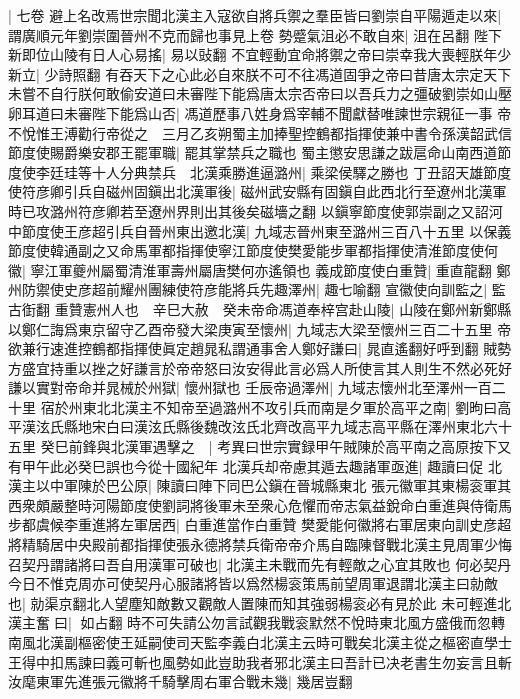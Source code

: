 |{
	七卷}
避上名改焉世宗聞北漢主入寇欲自將兵禦之羣臣皆曰劉崇自平陽遁走以來|{
	謂廣順元年劉崇圍晉州不克而歸也事見上卷}
勢蹙氣沮必不敢自來|{
	沮在呂翻}
陛下新即位山陵有日人心易搖|{
	易以䜴翻}
不宜輕動宜命將禦之帝曰崇幸我大喪輕朕年少新立|{
	少詩照翻}
有吞天下之心此必自來朕不可不往馮道固爭之帝曰昔唐太宗定天下未嘗不自行朕何敢偷安道曰未審陛下能爲唐太宗否帝曰以吾兵力之彊破劉崇如山壓卵耳道曰未審陛下能爲山否|{
	馮道歷事八姓身爲宰輔不聞獻替唯諫世宗親征一事}
帝不悅惟王溥勸行帝從之　三月乙亥朔蜀主加捧聖控鶴都指揮使兼中書令孫漢韶武信節度使賜爵樂安郡王罷軍職|{
	罷其掌禁兵之職也}
蜀主懲安思謙之跋扈命山南西道節度使李廷珪等十人分典禁兵　北漢乘勝進逼潞州|{
	乘梁侯驛之勝也}
丁丑詔天雄節度使符彦卿引兵自磁州固鎭出北漢軍後|{
	磁州武安縣有固鎭自此西北行至遼州北漢軍時已攻潞州符彦卿若至遼州界則出其後矣磁墻之翻}
以鎭寧節度使郭崇副之又詔河中節度使王彦超引兵自晉州東出邀北漢|{
	九域志晉州東至潞州三百八十五里}
以保義節度使韓通副之又命馬軍都指揮使寧江節度使樊愛能步軍都指揮使清淮節度使何徽|{
	寧江軍夔州屬蜀清淮軍壽州屬唐樊何亦遙領也}
義成節度使白重贊|{
	重直龍翻}
鄭州防禦使史彦超前耀州團練使符彦能將兵先趣澤州|{
	趣七喻翻}
宣徽使向訓監之|{
	監古衘翻}
重贊憲州人也　辛巳大赦　癸未帝命馮道奉梓宫赴山陵|{
	山陵在鄭州新鄭縣}
以鄭仁誨爲東京留守乙酉帝發大梁庚寅至懷州|{
	九域志大梁至懷州三百二十五里}
帝欲兼行速進控鶴都指揮使眞定趙晁私謂通事舍人鄭好謙曰|{
	晁直遙翻好呼到翻}
賊勢方盛宜持重以挫之好謙言於帝帝怒曰汝安得此言必爲人所使言其人則生不然必死好謙以實對帝命并晁械於州獄|{
	懷州獄也}
壬辰帝過澤州|{
	九域志懷州北至澤州一百二十里}
宿於州東北北漢主不知帝至過潞州不攻引兵而南是夕軍於高平之南|{
	劉昫曰高平漢泫氏縣地宋白曰漢泫氏縣後魏改泫氏北齊改高平九域志高平縣在澤州東北六十五里}
癸巳前鋒與北漢軍遇擊之　|{
	考異曰世宗實録甲午賊陳於高平南之高原按下又有甲午此必癸巳誤也今從十國紀年}
北漢兵却帝慮其遁去趣諸軍亟進|{
	趣讀曰促}
北漢主以中軍陳於巴公原|{
	陳讀曰陣下同巴公鎭在晉城縣東北}
張元徽軍其東楊衮軍其西衆頗嚴整時河陽節度使劉詞將後軍未至衆心危懼而帝志氣益銳命白重進與侍衛馬步都虞候李重進將左軍居西|{
	白重進當作白重贊}
樊愛能何徽將右軍居東向訓史彦超將精騎居中央殿前都指揮使張永德將禁兵衛帝帝介馬自臨陳督戰北漢主見周軍少悔召契丹謂諸將曰吾自用漢軍可破也|{
	北漢主未戰而先有輕敵之心宜其敗也}
何必契丹今日不惟克周亦可使契丹心服諸將皆以爲然楊衮策馬前望周軍退謂北漢主曰勍敵也|{
	勍渠京翻北人望塵知敵數又觀敵人置陳而知其強弱楊衮必有見於此}
未可輕進北漢主奮曰|{
	如占翻}
時不可失請公勿言試觀我戰衮默然不悅時東北風方盛俄而忽轉南風北漢副樞密使王延嗣使司天監李義白北漢主云時可戰矣北漢主從之樞密直學士王得中扣馬諫曰義可斬也風勢如此豈助我者邪北漢主曰吾計已决老書生勿妄言且斬汝麾東軍先進張元徽將千騎擊周右軍合戰未幾|{
	幾居豈翻}

